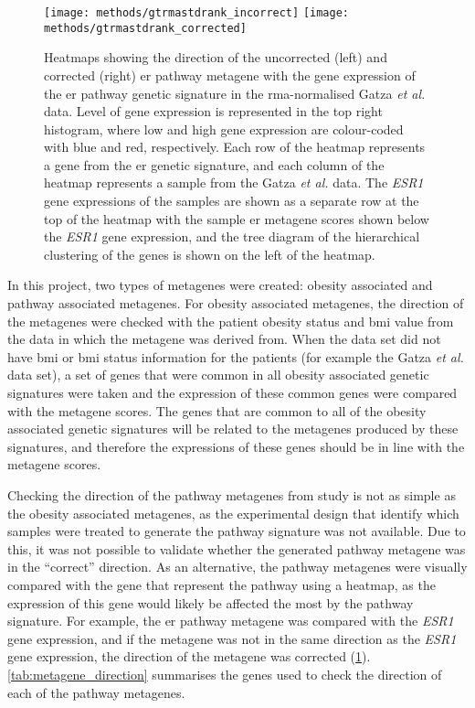 \begin{figure}[htpb]
	\centering
	\texttt{[image: methods/gtrmastdrank\_incorrect]}
	\hfill
	\texttt{[image: methods/gtrmastdrank\_corrected]}
	\caption[Example heatmaps showing the direction of the uncorrected and corrected \acrshort{er} pathway metagene with the gene expression of the \acrshort{er} pathway genetic signature in the \acrshort{rma}-normalised Gatza \textit{et al.} data.]{Heatmaps showing the direction of the uncorrected (left) and corrected (right) \gls{er} pathway metagene with the gene expression of the \gls{er} pathway genetic signature in the \gls{rma}-normalised Gatza \textit{et al.} data.
	Level of gene expression is represented in the top right histogram, where low and high gene expression are colour-coded with blue and red, respectively.
	Each row of the heatmap represents a gene from the \gls{er} genetic signature, and each column of the heatmap represents a sample from the Gatza \textit{et al.} data.
	The \textit{ESR1} gene expressions of the samples are shown as a separate row at the top of the heatmap with the sample \gls{er} metagene scores shown below the \textit{ESR1} gene expression, and the tree diagram of the hierarchical clustering of the genes is shown on the left of the heatmap.
	}
	\label{fig:methods/meta_dir}
\end{figure}

In this project, two types of metagenes were created: obesity associated and pathway associated metagenes.
For obesity associated metagenes, the direction of the metagenes were checked with the patient obesity status and \gls{bmi} value from the data in which the metagene was derived from.
When the data set did not have \gls{bmi} or \gls{bmi} status information for the patients (for example the Gatza \textit{et al.} data set), a set of genes that were common in all obesity associated genetic signatures were taken and the expression of these common genes were compared with the metagene scores.
The genes that are common to all of the obesity associated genetic signatures will be related to the metagenes produced by these signatures, and therefore the expressions of these genes should be in line with the metagene scores.

Checking the direction of the pathway metagenes from \citet{Gatza2010a} study is not as simple as the obesity associated metagenes, as the experimental design that identify which samples were treated to generate the pathway signature was not available.
Due to this, it was not possible to validate whether the generated pathway metagene was in the ``correct'' direction.
As an alternative, the pathway metagenes were visually compared with the gene that represent the pathway using a heatmap, as the expression of this gene would likely be affected the most by the pathway signature.
For example, the \gls{er} pathway metagene was compared with the \textit{ESR1} gene expression, and if the metagene was not in the same direction as the \textit{ESR1} gene expression, the direction of the metagene was corrected (\cref{fig:methods/meta_dir}).
\cref{tab:metagene_direction} summarises the genes used to check the direction of each of the pathway metagenes.

